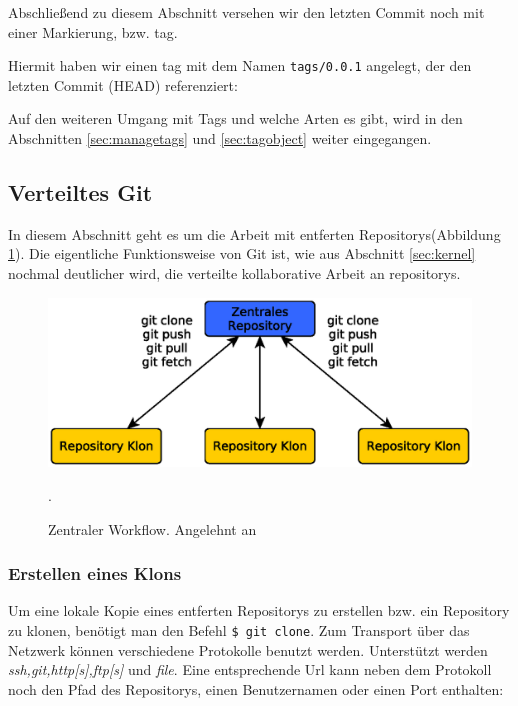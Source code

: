 Abschließend zu diesem Abschnitt versehen wir den letzten Commit noch mit einer
Markierung, bzw. \gls{tag}.


Hiermit haben wir einen \gls{tag} mit dem Namen \texttt{tags/0.0.1} angelegt,
der den letzten Commit (\gls{HEAD}) referenziert:


Auf den weiteren Umgang mit Tags und welche Arten es gibt, wird in den
Abschnitten \ref{sec:managetags} und \ref{sec:tagobject} weiter eingegangen.

\subsection{Verteiltes Git}\label{sec:distributed}
In diesem Abschnitt geht es um die Arbeit mit entferten Repositorys(Abbildung
\ref{fig:centralworkflow}). Die eigentliche Funktionsweise von Git ist, wie
aus Abschnitt \ref{sec:kernel} nochmal deutlicher wird, die verteilte
kollaborative Arbeit an \glspl{repository}.

\begin{figure}[h]
  \centering
  \includegraphics[scale=0.70]{images/workflow.eps}
  \caption{Zentraler Workflow. Angelehnt an \cite[S.~138]{gitosp}}.
  \label{fig:centralworkflow}
\end{figure}

\subsubsection{Erstellen eines Klons}\label{sec:gitclone}
Um eine lokale Kopie eines entferten Repositorys zu erstellen bzw. ein
Repository zu klonen, benötigt man den Befehl \texttt{\$ git clone}. Zum
Transport über das Netzwerk können verschiedene Protokolle benutzt werden.
Unterstützt werden \textit{ssh,git,http[s],ftp[s]} und \textit{file}. Eine
entsprechende Url kann neben dem Protokoll noch den Pfad des Repositorys, einen
Benutzernamen oder einen Port enthalten:

